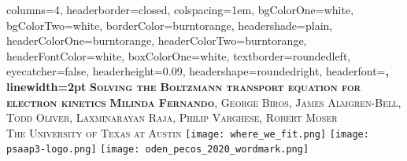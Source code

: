 \documentclass[landscape,archE,fontscale=0.285]{baposter} %
\begin{document}
\begin{poster}
{
columns=4, %
headerborder=closed, %
colspacing=1em, %
bgColorOne=white, %
bgColorTwo=white, %
borderColor=burntorange, %
headershade=plain,
headerColorOne=burntorange, %
headerColorTwo=burntorange, %
headerFontColor=white, %
boxColorOne=white, %
textborder=roundedleft, %
eyecatcher=false, %
headerheight=0.09\textheight, %
headershape=roundedright, %
headerfont=\Large\bf\textsc, %
linewidth=2pt %
}
%
{}
{\bf\textsc{Solving the Boltzmann transport equation for electron kinetics}\vspace{0.01em}} %
{\textsc{\small \textbf{Milinda Fernando}, George Biros, James Almgren-Bell, Todd Oliver, Laxminarayan Raja, Philip Varghese, Robert Moser  \hspace{12pt} \\The University of Texas at Austin}} %
{\texttt{[image: where\_we\_fit.png]}%
\hspace{12pt} \texttt{[image: psaap3-logo.png]}%
\hspace{12pt} \texttt{[image: oden\_pecos\_2020\_wordmark.png]}%
}



\end{poster}
\end{document}
